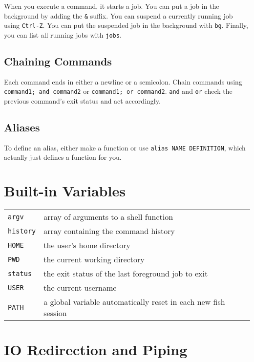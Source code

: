 \documentclass[10pt]{extarticle}
\begin{document}
\begin{paracol}{2}
When you execute a command, it starts a job.
You can put a job in the background by adding the \texttt{\&} suffix.
You can suspend a currently running job using \texttt{Ctrl-Z}.
You can put the suspended job in the background with \texttt{bg}.
Finally, you can list all running jobs with \texttt{jobs}.

\subsection*{Chaining Commands}

Each command ends in either a newline or a semicolon.
Chain commands using \texttt{command1; and command2} or \texttt{command1; or command2}.
\texttt{and} and \texttt{or} check the previous command's exit status and act accordingly.

\subsection*{Aliases}

To define an alias, either make a function or use \texttt{alias NAME DEFINITION}, which actually just defines a function for you.

\switchcolumn

\section*{Built-in Variables}

\begin{tabularx}{\columnwidth}{X X}
    \texttt{argv} & array of arguments to a shell function\\
    \texttt{history} & array containing the command history\\
    \texttt{HOME} & the user's home directory\\
    \texttt{PWD} & the current working directory\\
    \texttt{status} & the exit status of the last foreground job to exit\\
    \texttt{USER} & the current username \\
    \texttt{PATH} & a global variable automatically reset in each new fish session
\end{tabularx}


\section*{IO Redirection and Piping}


\end{paracol}
\end{document}
